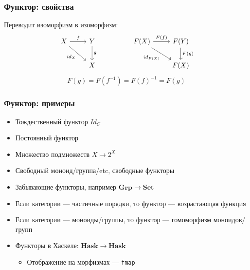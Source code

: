 \documentclass{beamer}
\begin{document}
\begin{frame}[fragile]
\frametitle{Функтор: свойства}
Переводит изоморфизм в изоморфизм:
\begin{equation}
\begin{tikzcd}
X \arrow{r}{f} \arrow{rd}[swap]{id_X} & Y \arrow{d}{g} && F(X) \arrow{r}{F(f)} \arrow{rd}[swap]{id_{F(X)}} & F(Y) \arrow{d}{F(g)} \\
& X &&& F(X)
\end{tikzcd}
\end{equation}
\pause
\begin{equation}
F(g) = F(f^{-1}) = F(f)^{-1} = F(g)
\end{equation}
\end{frame}

\begin{frame}
\frametitle{Функтор: примеры}
\begin{itemize}
\pause
\item Тождественный функтор \begin{math}Id_C\end{math}
\pause
\item Постоянный функтор
\pause
\item Множество подмножеств \begin{math}X \mapsto 2^X\end{math}
\pause
\item Свободный моноид/группа/etc, свободные функторы
\pause
\item Забывающие функторы, например \begin{math}\mathbf{Grp} \rightarrow \mathbf{Set}\end{math}
\pause
\item Если категории --- частичные порядки, то функтор --- возрастающая функция
\pause
\item Если категории --- моноиды/группы, то функтор --- гомоморфизм моноидов/групп
\pause
\item Функторы в Хаскеле: \begin{math}\mathbf{Hask} \rightarrow \mathbf{Hask}\end{math}
\begin{itemize}
\item Отображение на морфизмах --- \texttt{fmap}
\end{itemize}
\end{itemize}
\end{frame}
\end{document}
